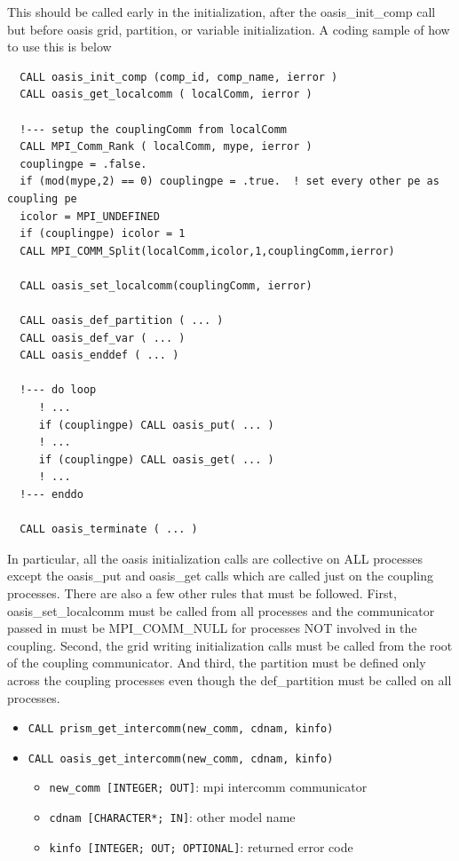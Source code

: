 This should be called early in the initialization, after the oasis\_init\_comp
call but before oasis grid, partition, or variable initialization.  A coding
sample of how to use this is below 
 
\begin{verbatim}
  CALL oasis_init_comp (comp_id, comp_name, ierror )
  CALL oasis_get_localcomm ( localComm, ierror )

  !--- setup the couplingComm from localComm
  CALL MPI_Comm_Rank ( localComm, mype, ierror )
  couplingpe = .false.
  if (mod(mype,2) == 0) couplingpe = .true.  ! set every other pe as coupling pe
  icolor = MPI_UNDEFINED
  if (couplingpe) icolor = 1
  CALL MPI_COMM_Split(localComm,icolor,1,couplingComm,ierror)

  CALL oasis_set_localcomm(couplingComm, ierror)

  CALL oasis_def_partition ( ... )
  CALL oasis_def_var ( ... )
  CALL oasis_enddef ( ... )

  !--- do loop
     ! ...
     if (couplingpe) CALL oasis_put( ... )
     ! ...
     if (couplingpe) CALL oasis_get( ... )
     ! ...
  !--- enddo

  CALL oasis_terminate ( ... )
\end{verbatim}

In particular, all the oasis initialization calls are collective
on ALL processes except the oasis\_put and oasis\_get calls which 
are called just on the coupling processes.  There are also a few
other rules that must be followed.  First, oasis\_set\_localcomm
must be called from all processes and the communicator passed
in must be MPI\_COMM\_NULL for processes NOT involved in the coupling.
Second, the grid writing initialization calls must be called from
the root of the coupling communicator.  And third, the partition
must be defined only across the coupling processes even though
the def\_partition must be called on all processes.


\begin{itemize} 
\item {\tt CALL prism\_get\_intercomm(new\_comm, cdnam, kinfo)}
\item {\tt CALL oasis\_get\_intercomm(new\_comm, cdnam, kinfo)}
\begin{itemize}
\item {\tt new\_comm [INTEGER; OUT]}: mpi intercomm communicator
\item {\tt cdnam [CHARACTER*; IN]}: other model name 
\item {\tt kinfo [INTEGER; OUT; OPTIONAL]}: returned error code
\end{itemize}
\end{itemize}


